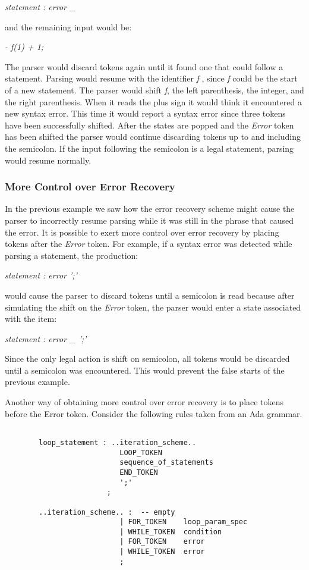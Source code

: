 \centerline{\it statement : error \_}

and the remaining input would be:

\centerline{\it - f(1) + 1;}

The parser would discard tokens again until it found one
that could follow a statement.  Parsing would resume with the identifier
{\it f}
, since
{\it f}
could be the start of a new statement.  The parser would shift
{\it f},
the left parenthesis, the integer, and the right parenthesis.  When it
reads the plus sign it would think it encountered a new
syntax error.  This time it would report
a syntax error since three tokens have been successfully shifted.  After
the states are popped and the
{\it Error}
token has been shifted the parser would continue discarding
tokens up to and including the semicolon.  If the input following the
semicolon is a legal statement, parsing would resume normally.
\subsubsection{More Control over Error Recovery}
In the previous example we saw how the error recovery scheme might
cause the parser to incorrectly resume parsing while it was still
in the phrase that caused the error.  It is possible to exert more
control over error recovery by placing tokens after the
{\it Error}
token.  For example, if a syntax error was detected while parsing
a statement, the production:

\centerline{\it statement : error ';'}

would cause the parser to discard tokens until a semicolon is read
because
after simulating the shift on
the
{\it Error}
token, the parser would enter a state associated with the item:

\centerline{\it statement : error \_ ';'}

Since the only legal action is shift on semicolon, all tokens would
be discarded until a semicolon was encountered.  This would prevent
the false starts of the previous example.

Another way of obtaining more control over error recovery is
to place tokens before the Error token.  Consider the following
rules taken from an Ada grammar.
\begin{verbatim}

        loop_statement : ..iteration_scheme..
                           LOOP_TOKEN
                           sequence_of_statements
                           END_TOKEN
                           ';'
                        ;

        ..iteration_scheme.. :  -- empty
                           | FOR_TOKEN    loop_param_spec
                           | WHILE_TOKEN  condition
                           | FOR_TOKEN    error
                           | WHILE_TOKEN  error
                           ;

\end{verbatim}


